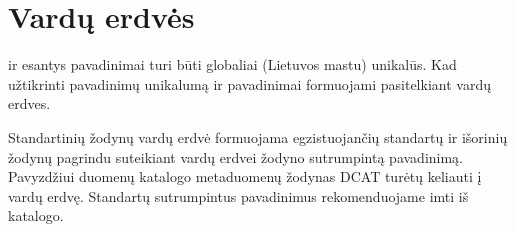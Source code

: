 \documentclass[letterpaper,10pt,lithuanian]{sphinxmanual}
\begin{document}
\sphinxstepscope


\section{Vardų erdvės}
\label{\detokenize{vardu-erdves:vardu-erdves}}\label{\detokenize{vardu-erdves:ns}}\label{\detokenize{vardu-erdves::doc}}
\sphinxAtStartPar
{\hyperref[\detokenize{formatas:dataset}]{}} ir {\hyperref[\detokenize{formatas:model}]{}} esantys pavadinimai turi būti globaliai
(Lietuvos mastu) unikalūs. Kad užtikrinti pavadinimų unikalumą {\hyperref[\detokenize{formatas:dataset}]{}}
ir {\hyperref[\detokenize{formatas:model}]{}} pavadinimai formuojami pasitelkiant vardų erdves.


\begin{fulllineitems}

\pysigstartsignatures
{}
\pysigstopsignatures
\sphinxAtStartPar
{}

\sphinxAtStartPar
Standartinių žodynų vardų erdvė formuojama egzistuojančių standartų ir
išorinių žodynų pagrindu suteikiant vardų erdvei  žodyno
sutrumpintą pavadinimą. Pavyzdžiui duomenų katalogo metaduomenų žodynas
DCAT turėtų keliauti į  vardų erdvę. Standartų sutrumpintus
pavadinimus rekomenduojame imti iš  katalogo.

\end{fulllineitems}
\end{document}
